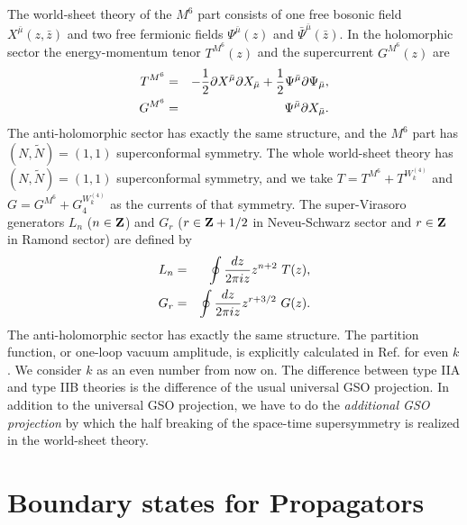 \documentclass[a4paper,prd,preprint]{revtex4}
\begin{document}
The world-sheet theory of the $M^6$ part consists of
 one free bosonic field $X^{\bar \mu}(z,{\bar z})$
 and two free fermionic fields
 $\Psi^{\bar \mu}(z)$ and ${\bar \Psi}^{\bar \mu}({\bar z})$.
In the holomorphic sector
 the energy-momentum tenor $T^{M^6}(z)$
 and the supercurrent $G^{M^6}(z)$ are
\begin{eqnarray}
 T^{M^6} &=& - {1 \over 2}
               \partial X^{\bar \mu} 
               \partial X_{\bar \mu}
             + {1 \over 2}
               \Psi^{\bar \mu} \partial \Psi_{\bar \mu},
\\
 G^{M^6} &=& \Psi^{\bar \mu} \partial X_{\bar \mu}.
\end{eqnarray}
The anti-holomorphic sector has exactly the same structure,
 and the $M^6$ part has $(N,{\tilde N}) = (1,1)$
 superconformal symmetry.
The whole world-sheet theory
 has $(N,{\tilde N}) = (1,1)$ superconformal symmetry,
 and we take
 $T=T^{M^6}+T^{W^{(4)}_k}$ and $G=G^{M^6}+G_4^{W^{(4)}_k}$
 as the currents of that symmetry.
The super-Virasoro generators $L_n$ ($n \in {\bf Z}$)
 and $G_r$ ($r \in {\bf Z}+1/2$ in Neveu-Schwarz sector
 and $r \in {\bf Z}$ in Ramond sector) are defined by
\begin{eqnarray}
 L_n &=& \oint {{dz} \over {2 \pi i z}} z^{n+2} \ T(z),
\\
 G_r &=& \oint {{dz} \over {2 \pi i z}} z^{r+3/2} \ G(z) .
\end{eqnarray}
The anti-holomorphic sector has exactly the same structure.
The partition function, or one-loop vacuum amplitude,
 is explicitly calculated in Ref.\cite{AFK}
 for even $k$.
We consider $k$ as an even number from now on. 
The difference between type IIA and type IIB theories
 is the difference of the usual universal GSO projection.
In addition to the universal GSO projection,
 we have to do the {\it additional GSO projection}
 by which the half breaking of the space-time supersymmetry
 is realized in the world-sheet theory.

\section{Boundary states for Propagators}
\label{sec:boundary}
\end{document}
